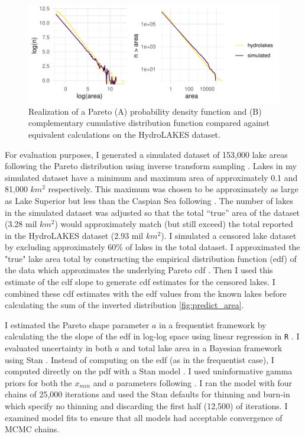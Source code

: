 \documentclass{article}
\begin{document}
\begin{figure}[h]
	\centering
	\includegraphics{figures/pareto_demo-1}
	\caption{Realization of a Pareto (A) probability density function and (B) complementary cumulative distribution function compared against equivalent calculations on the HydroLAKES dataset.}
	\label{fig:pareto_demo}
\end{figure}

For evaluation purposes, I generated a simulated dataset of 153,000 lake areas following the Pareto distribution using inverse transform sampling \citep{newman_power_2005}. Lakes in my simulated dataset have a minimum and maximum area of approximately 0.1 and 81,000 $km^2$ respectively. This maximum was chosen to be approximately as large as Lake Superior but less than the Caspian Sea following \citep{lehnerDevelopmentValidationGlobal2004}. The number of lakes in the simulated dataset was adjusted so that the total “true” area of the dataset (3.28 mil $km^2$) would approximately match (but still exceed) the total reported in the HydroLAKES dataset (2.93 mil $km^2$). I simulated a censored lake dataset by excluding approximately 60\% of lakes in the total dataset. I approximated the "true" lake area total by constructing the empirical distribution function (edf) of the data which approximates the underlying Pareto cdf \citep{newman_power_2005}. Then I used this estimate of the cdf slope to generate cdf estimates for the censored lakes. I combined these cdf estimates with the edf values from the known lakes before calculating the sum of the inverted distribution \ref{fig:predict_area}.

I estimated the Pareto shape parameter $a$ in a frequentist framework by calculating the the slope of the edf in log-log space using linear regression in \texttt{R} \citep{team2013r}. I evaluated uncertainty in both $a$ and total lake area in a Bayesian framework using Stan \citep{standevelopmentteamStanModelingLanguage2017}. Instead of computing on the edf (as in the frequentist case), I computed directly on the pdf with a Stan model \citep
[See][]{jemma_stachelek_2022_7459227}. I used uninformative gamma priors for both the $x_{min}$ and $a$ parameters following \citet{scollnikCompositeLognormalParetoModels2007}. I ran the model with four chains of 25,000 iterations and used the Stan defaults for thinning and burn-in which specify no thinning and discarding the first half (12,500) of iterations. I examined model fits to ensure that all models had acceptable convergence of MCMC chains.
\end{document}
